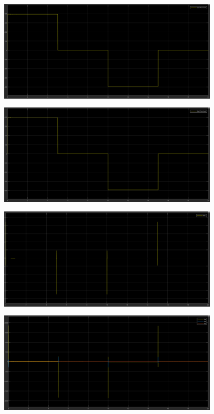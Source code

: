 \documentclass{article}
\begin{document}
\begin{figure}[H]
    \centering
    \includegraphics[width=1\textwidth]{5.2.4.a.3.png}
\end{figure}

\begin{figure}[H]
    \centering
    \includegraphics[width=1\textwidth]{5.2.4.a.4.png}
\end{figure}

\begin{figure}[H]
    \centering
    \includegraphics[width=1\textwidth]{5.2.4.a.5.png}
\end{figure}

\begin{figure}[H]
    \centering
    \includegraphics[width=1\textwidth]{5.2.4.a.6.png}
\end{figure}
\end{document}
